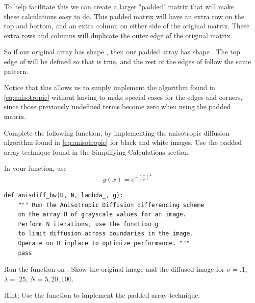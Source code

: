 To help facilitate this we can create a larger "padded" matrix that will make these calculations easy to do.
This padded matrix will have an extra row on the top and bottom, and an extra column on either side of the original matrix.
These extra rows and columns will duplicate the outer edge of the original matrix.

So if our original array  has shape , then our padded array  has shape .
The top edge of  will be defined so that  is true, and the rest of the edges of  follow the same pattern.

Notice that this allows us to simply implement the algorithm found in \ref{eq:anisotropic} without having to make special cases for the edges and corners, since those previously undefined terms become zero when using the padded matrix.

\begin{problem}
\label{prob:anisdiff_bw}
Complete the following function, by implementing the anisotropic diffusion algorithm found in \ref{eq:anisotropic} for black and white images.
Use the padded array technique found in the Simplifying Calculations section.


In your function, use
\[g(x) = e^{-\left(\frac{x}{\sigma}\right)^2}\]

\begin{lstlisting}
def anisdiff_bw(U, N, lambda_, g):
    """ Run the Anisotropic Diffusion differencing scheme
    on the array U of grayscale values for an image.
    Perform N iterations, use the function g
    to limit diffusion across boundaries in the image.
    Operate on U inplace to optimize performance. """
    pass
\end{lstlisting}
Run the function on .
Show the original image and the diffused image for $\sigma = .1$, $\lambda = .25$, $N = 5, 20, 100$.

Hint: Use the  function to implement the padded array technique.
\end{problem}

